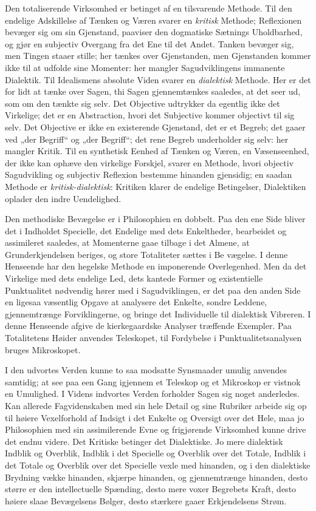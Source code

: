 \documentclass[12pt]{book}
\newcommand{\opage}[1]{\marginnote{\footnotesize\textit{[#1]}}}
\begin{document}
Den totaliserende Virksomhed er betinget af en tilsvarende Methode. Til den endelige
Adskillelse af Tænken og Væren svarer en \emph{kritisk} Methode; Reflexionen bevæger sig om
sin Gjenstand, paaviser den dogmatiske Sætnings Uholdbarhed, og gjør en subjectiv Overgang
fra det Ene til det Andet. Tanken bevæger sig, men Tingen staaer stille; her tænkes over
Gjenstanden, men Gjenstanden kommer ikke til at udfolde sine Momenter: her mangler
Sagudviklingens immanente Dialektik. Til Idealismens absolute Viden svarer en
\emph{dialektisk} Methode. Her er det for lidt at tænke over Sagen, thi Sagen gjennemtænkes
saaledes, at det seer ud, som om den tænkte sig selv. Det Objective udtrykker da egentlig
ikke det Virkelige; det er en Abstraction, hvori det Subjective kommer objectivt til sig
selv. Det Objective er ikke en existerende Gjenstand, det er et Begreb; det gaaer ved
„der Begriff“ og „der Begriff“; det rene Begreb underholder sig selv: her mangler Kritik.
Til en synthetisk Eenhed af Tænken og Væren, en Væsenseenhed, der ikke kan ophæve den
virkelige Forskjel, svarer en Methode, hvori objectiv Sagudvikling og subjectiv Reflexion
bestemme hinanden gjensidig; en saadan Methode er \emph{kritisk-dialektisk}: Kritiken klarer
de endelige Betingelser, Dialektiken oplader den indre Uendelighed.

Den methodiske Bevægelse er i Philosophien en dobbelt. Paa den ene Side bliver det i
Indholdet Specielle, det Endelige med dets Enkeltheder, bearbeidet og assimileret saaledes,
at Momenterne gaae tilbage i det Almene, at Grunderkjendelsen beriges, og store Totaliteter
sættes i Be%
\opage{116}vægelse. I denne Henseende har den hegelske Methode en imponerende Overlegenhed. Men da det
Virkelige med dets endelige Led, dets kantede Former og existentielle Punktualitet nødvendig
hører med i Sagudviklingen, er det paa den anden Side en ligesaa væsentlig Opgave at
analysere det Enkelte, sondre Leddene, gjennemtrænge Forviklingerne, og bringe det
Individuelle til dialektisk Vibreren. I denne Henseende afgive de kierkegaardske Analyser
træffende Exempler. Paa Totalitetens Høider anvendes Teleskopet, til Fordybelse i
Punktualitetsanalysen bruges Mikroskopet.

I den udvortes Verden kunne to saa modsatte Synsmaader umulig anvendes samtidig; at see paa
een Gang igjennem et Teleskop og et Mikroskop er vistnok en Umulighed. I Videns indvortes
Verden forholder Sagen sig noget anderledes. Kan allerede Fagvidenskaben med sin hele Detail
og sine Rubriker arbeide sig op til høiere Vexelforhold af Indsigt i det Enkelte og Oversigt
over det Hele, maa jo Philosophien med sin assimilerende Evne og frigjørende Virksomhed
kunne drive det endnu videre. Det Kritiske betinger det Dialektiske. Jo mere dialektisk
Indblik og Overblik, Indblik i det Specielle og Overblik over det Totale, Indblik i det
Totale og Overblik over det Specielle vexle med hinanden, og i den dialektiske Brydning
vække hinanden, skjærpe hinanden, og gjennemtrænge hinanden, desto større er den
intellectuelle Spænding, desto mere voxer Begrebets Kraft, desto høiere slaae Bevægelsens
Bølger, desto stærkere gaaer Erkjendelsens Strøm.
\end{document}
